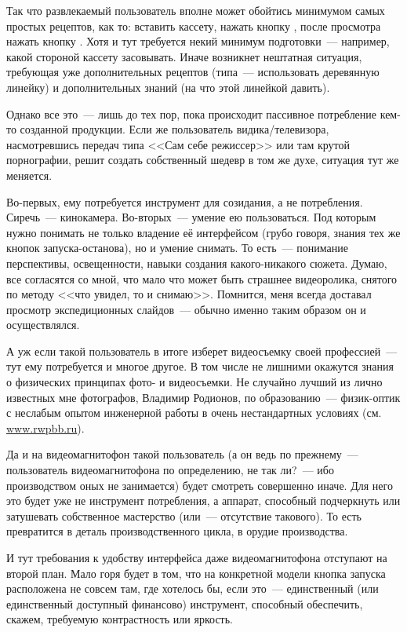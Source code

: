Так что развлекаемый пользователь вполне может обойтись минимумом самых простых рецептов, как то: вставить кассету, нажать кнопку 
, после просмотра нажать кнопку . Хотя и тут требуется некий минимум подготовки~--- например, какой стороной кассету засовывать. Иначе возникнет нештатная ситуация, требующая уже дополнительных рецептов (типа~--- использовать деревянную линейку) и дополнительных знаний (на что этой линейкой давить).

Однако все это~--- лишь до тех пор, пока происходит пассивное потребление кем-то созданной продукции. Если же пользователь видика/телевизора, насмотревшись передач типа <<Сам себе режиссер>> или там крутой порнографии, решит создать собственный шедевр в том же духе, ситуация тут же меняется.

Во-первых, ему потребуется инструмент для созидания, а не потребления. Сиречь~--- кинокамера. Во-вторых~--- умение ею пользоваться. Под которым нужно понимать не только владение её интерфейсом (грубо говоря, знания тех же кнопок запуска-останова), но и умение снимать. То есть~--- понимание перспективы, освещенности, навыки создания какого-никакого сюжета. Думаю, все согласятся со мной, что мало что может быть страшнее видеоролика, снятого по методу <<что увидел, то и снимаю>>. Помнится, меня всегда доставал просмотр экспедиционных слайдов~--- обычно именно таким образом он и осуществлялся.

А уж если такой пользователь в итоге изберет видеосъемку своей профессией~--- тут ему потребуется и многое другое. В том числе не лишними окажутся знания о физических принципах фото- и видеосъемки. Не случайно лучший из лично известных мне фотографов, Владимир Родионов, по образованию~--- физик-оптик с неслабым опытом инженерной работы в очень нестандартных условиях (см. \href{http://www.rwpbb.ru}{www.rwpbb.ru}).

Да и на видеомагнитофон такой пользователь (а он ведь по прежнему~--- пользователь видеомагнитофона по определению, не так ли?~--- ибо производством оных не занимается) будет смотреть совершенно иначе. Для него это будет уже не инструмент потребления, а аппарат, способный подчеркнуть или затушевать собственное мастерство (или~--- отсутствие такового). То есть превратится в деталь производственного цикла, в орудие производства.

И тут требования к удобству интерфейса даже видеомагнитофона отступают на второй план. Мало горя будет в том, что на конкретной модели кнопка запуска расположена не совсем там, где хотелось бы, если это~--- единственный (или единственный доступный финансово) инструмент, способный обеспечить, скажем, требуемую контрастность или яркость.

